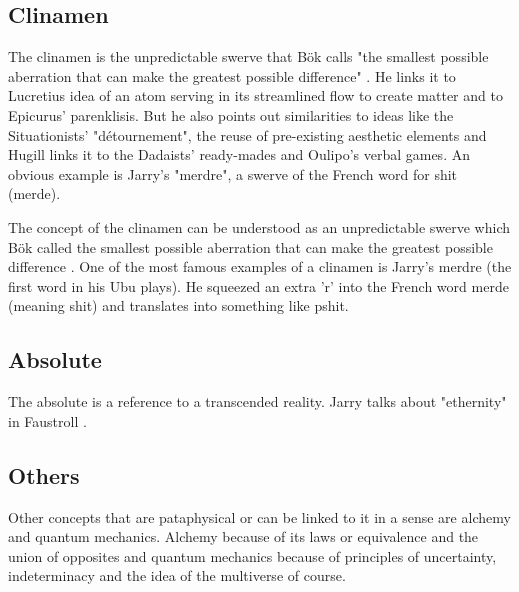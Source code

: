 \subsection{Clinamen}

The clinamen is the unpredictable swerve that Bök calls "the smallest possible aberration that can make the greatest possible difference"  \citep[p.43]{Bok2002}. He links it to Lucretius idea of an atom serving in its streamlined flow to create matter and to Epicurus' parenklisis. But he also points out similarities to ideas like the Situationists' "détournement", the reuse of pre-existing aesthetic elements and Hugill links it to the Dadaists' ready-mades and Oulipo's verbal games. An obvious example is Jarry's "merdre", a swerve of the French word for shit (merde).

The concept of the clinamen can be understood as an unpredictable swerve which Bök called the smallest possible aberration that can make the greatest possible difference \citep{Bok2002}. One of the most famous examples of a clinamen is Jarry's merdre (the first word in his Ubu plays). He squeezed an extra 'r' into the French word merde (meaning shit) and translates into something like pshit.

\subsection{Absolute}

The absolute is a reference to a transcended reality. Jarry talks about "ethernity" in Faustroll \citep[p.104]{Jarry1996}.

\subsection*{Others}

Other concepts that are pataphysical or can be linked to it in a sense are alchemy and quantum mechanics. Alchemy because of its laws or equivalence and the union of opposites \citep{Hugill2012} and quantum mechanics because of principles of uncertainty, indeterminacy and the idea of the multiverse of course.

